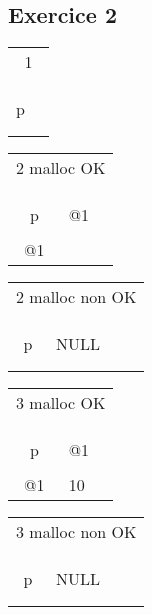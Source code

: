 \subsection{Exercice 2}

\begin{tabular}{c|p{1cm}|}
	\multicolumn{2}{c|}{1}\\
	&\\
	\hline
	&\\	
	\hline
	&\\
	\hline
	p&\\
	\hline
	&\\
	\hline
	&\\	
	\hline
\end{tabular}
\begin{tabular}{c|p{1cm}|}
	\multicolumn{2}{c|}{2 malloc OK}\\
	&\\
	\hline
	&\\	
	\hline
	&\\
	\hline
	p& @1\\
	\hline
	&\\
	\hline
	@1&\\	
	\hline
\end{tabular}
\begin{tabular}{c|p{1cm}|}
	\multicolumn{2}{c|}{2 malloc non OK}\\
	&\\
	\hline
	&\\	
	\hline
	&\\
	\hline
	p&NULL\\
	\hline
	&\\
	\hline
	&\\	
	\hline
\end{tabular}
\begin{tabular}{c|p{1cm}|}
	\multicolumn{2}{c|}{3 malloc OK}\\
	&\\
	\hline
	&\\	
	\hline
	&\\
	\hline
	p&@1\\
	\hline
	&\\
	\hline
	@1&10\\	
	\hline
\end{tabular}
\begin{tabular}{c|p{1cm}|}
	\multicolumn{2}{c|}{3 malloc non OK}\\
	&\\
	\hline
	&\\	
	\hline
	&\\
	\hline
	p&NULL\\
	\hline
	&\\
	\hline
	&\\	
	\hline
\end{tabular}


